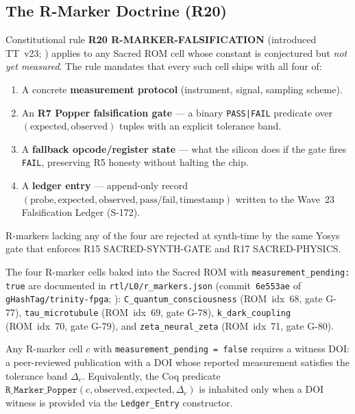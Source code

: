 \subsection{The R-Marker Doctrine (R20)}

Constitutional rule \textbf{R20 R-MARKER-FALSIFICATION}
(introduced TT~v23; \cite{trinity-fpga:r20-doc}) applies to any Sacred ROM
cell whose constant is conjectured but \emph{not yet measured}.
The rule mandates that every such cell ships with all four of:
\begin{enumerate}
  \item A concrete \textbf{measurement protocol} (instrument, signal,
        sampling scheme).
  \item An \textbf{R7 Popper falsification gate} — a binary
        \texttt{PASS|FAIL} predicate over \((\mathrm{expected},
        \mathrm{observed})\) tuples with an explicit tolerance band.
  \item A \textbf{fallback opcode/register state} — what the silicon does if
        the gate fires \texttt{FAIL}, preserving R5 honesty without halting
        the chip.
  \item A \textbf{ledger entry} — append-only record
        \((\mathrm{probe}, \mathrm{expected}, \mathrm{observed},
        \mathrm{pass/fail}, \mathrm{timestamp})\) written to the Wave~23
        Falsification Ledger (S-172).
\end{enumerate}

R-markers lacking any of the four are rejected at synth-time by the same Yosys
gate that enforces R15 SACRED-SYNTH-GATE and R17 SACRED-PHYSICS.

The four R-marker cells baked into the Sacred ROM with
\texttt{measurement\_pending: true} are documented in
\texttt{rtl/L0/r\_markers.json} (commit~\texttt{6e553ae} of
\texttt{gHashTag/trinity-fpga}; \cite{trinity-fpga:r-markers}):
\texttt{C\_quantum\_consciousness} (ROM~idx~68, gate G-77),
\texttt{tau\_microtubule} (ROM~idx~69, gate G-78),
\texttt{k\_dark\_coupling} (ROM~idx~70, gate G-79), and
\texttt{zeta\_neural\_zeta} (ROM~idx~71, gate G-80).

\begin{theorem}\label{thm:r-marker-sound}
Any R-marker cell \(c\) with \texttt{measurement\_pending = false} requires a
witness DOI: a peer-reviewed publication with a DOI whose reported measurement
satisfies the tolerance band \(\Delta_c\).
Equivalently, the Coq predicate
\(\texttt{R\_Marker\_Popper}(c, \mathrm{observed}, \mathrm{expected},
\Delta_c)\) is inhabited only when a DOI witness is provided via the
\texttt{Ledger\_Entry} constructor.
\end{theorem}

